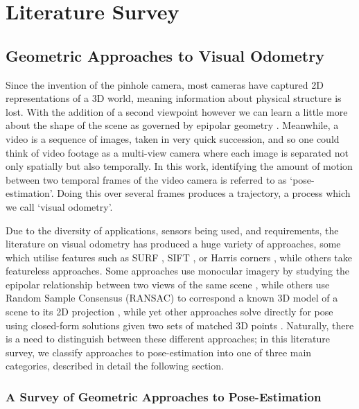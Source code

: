 

\chapter{Literature Survey}


\section{Geometric Approaches to Visual Odometry}

Since the invention of the pinhole camera, most cameras have captured 2D representations of a 3D world, meaning information about physical structure is lost. With the addition of a second viewpoint however we can learn a little more about the shape of the scene as governed by epipolar geometry \cite{zisserman2004multiview}. Meanwhile, a video is a sequence of images, taken in very quick succession, and so one could think of video footage as a multi-view camera where each image is separated not only spatially but also temporally. In this work, identifying the amount of motion between two temporal frames of the video camera is referred to as `pose-estimation'. Doing this over several frames produces a trajectory, a process which we call `visual odometry'.  

Due to the diversity of applications, sensors being used, and requirements, the literature on visual odometry has produced a huge variety of approaches, some which utilise features such as SURF \cite{bay2008surf}, SIFT \cite{lowe2004sift}, or Harris corners \cite{harris1988corners}, while others take featureless approaches. Some approaches use monocular imagery by studying the epipolar relationship between two views of the same scene \cite{longues-higgens1987reconstruction}, while others use Random Sample Consensus (RANSAC) to correspond a known 3D model of a scene to its 2D projection \cite{bolles1981ransac}, while yet other approaches solve directly for pose using closed-form solutions given two sets of matched 3D points \cite{dansereau2011plenopticflow}. Naturally, there is a need to distinguish between these different approaches; in this literature survey, we classify approaches to pose-estimation into one of three main categories, described in detail the following section.

\subsection{A Survey of Geometric Approaches to Pose-Estimation}

